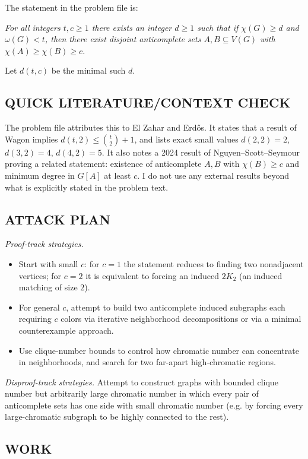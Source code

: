 The statement in the problem file is:

\emph{For all integers $t,c\ge 1$ there exists an integer $d\ge 1$ such that if $\chi(G)\ge d$ and $\omega(G)<t$, then there exist disjoint anticomplete sets $A,B\subseteq V(G)$ with $\chi(A)\ge \chi(B)\ge c$.}

Let $d(t,c)$ be the minimal such $d$.

\subsection*{QUICK LITERATURE/CONTEXT CHECK}
The problem file attributes this to El Zahar and Erd\H{o}s.
It states that a result of Wagon implies $d(t,2)\le \binom{t}{2}+1$, and lists exact small values $d(2,2)=2$, $d(3,2)=4$, $d(4,2)=5$.
It also notes a 2024 result of Nguyen--Scott--Seymour proving a related statement: existence of anticomplete $A,B$ with $\chi(B)\ge c$ and minimum degree in $G[A]$ at least $c$.
I do not use any external results beyond what is explicitly stated in the problem text.

\subsection*{ATTACK PLAN}
\emph{Proof-track strategies.}
\begin{itemize}
\item Start with small $c$: for $c=1$ the statement reduces to finding two nonadjacent vertices; for $c=2$ it is equivalent to forcing an induced $2K_2$ (an induced matching of size $2$).
\item For general $c$, attempt to build two anticomplete induced subgraphs each requiring $c$ colors via iterative neighborhood decompositions or via a minimal counterexample approach.
\item Use clique-number bounds to control how chromatic number can concentrate in neighborhoods, and search for two far-apart high-chromatic regions.
\end{itemize}

\emph{Disproof-track strategies.}
Attempt to construct graphs with bounded clique number but arbitrarily large chromatic number in which every pair of anticomplete sets has one side with small chromatic number (e.g. by forcing every large-chromatic subgraph to be highly connected to the rest).

\subsection*{WORK}
